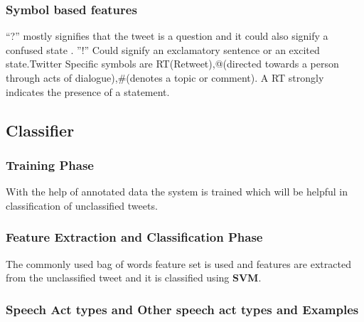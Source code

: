 \documentclass[conference]{IEEEtran}
\begin{document}
\begin{enumerate}
\subsubsection{\textbf{Symbol based features}}
\par “?” mostly signifies that the tweet is a question and it could also signify a confused state .  ”!” Could signify an exclamatory sentence or an excited state.Twitter Specific symbols are RT(Retweet),@(directed towards a person through acts of dialogue),\#(denotes a topic or comment). A RT strongly indicates the presence of a statement.

\subsection{\textbf{Classifier}}

\subsubsection{\textbf{Training Phase}}
\par With the help of annotated data the system is trained which will be helpful in classification of unclassified tweets.

\subsubsection{\textbf{Feature Extraction and Classification Phase}}
\par The commonly used bag of words feature set is used and features are extracted from the unclassified tweet and it is classified using \textbf{SVM}.

\subsubsection{\textbf{Speech Act types and Other speech act types and Examples}}
\begin{table}[!ht]
\centering

    \label{tab:Speech Act Types}


\end{table}
\end{enumerate}
\end{document}
